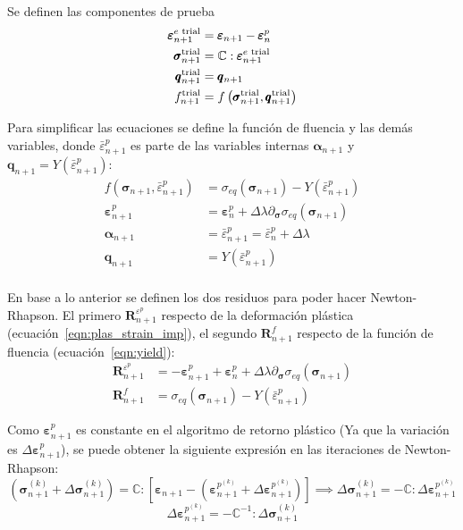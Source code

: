 \documentclass[12pt]{article}
\begin{document}
Se definen las componentes de prueba
\begin{align} 
    \pmb{\varepsilon}_{n+1}^{e\textnormal{ trial}} &= \pmb{\varepsilon}_{n+1} - \pmb{\varepsilon}_{n}^p \\
    \pmb{\sigma}_{n+1}^{\textnormal{trial}} &= \mathbb{C} : \pmb{\varepsilon}_{n+1}^{e\textnormal{ trial}} \\
    \pmb{q}_{n+1}^{\textnormal{trial}} &= \pmb{q}_{n+1} \\
    f_{n+1}^{\textnormal{trial}} &= f\left(\pmb{\sigma}_{n+1}^{\textnormal{trial}}, \pmb{q}_{n+1}^{\textnormal{trial}}\right)
\end{align}

Para simplificar las ecuaciones se define la función de fluencia y las demás variables, donde $\bar\varepsilon^p_{n+1}$ es parte de las variables internas $\pmb{\alpha}_{n+1}$ y $\pmb{q}_{n+1} = Y(\bar\varepsilon^p_{n+1})$:
\begin{align}
    f\left(\pmb{\sigma}_{n+1}, \bar\varepsilon^p_{n+1}\right) &= \sigma_{eq}\left(\pmb{\sigma}_{n+1}\right) - Y\left(\bar\varepsilon^p_{n+1}\right) \label{eqn:yield}\\
    \pmb{\varepsilon}_{n+1}^p &= \pmb{\varepsilon}^p_{n} + \Delta\lambda\partial_{\pmb{\sigma}}\sigma_{eq}\left(\pmb{\sigma}_{n+1}\right)  \label{eqn:plas_strain_imp}\\
    \pmb{\alpha}_{n+1} &= \bar\varepsilon^p_{n+1} = \bar\varepsilon^p_{n} + \Delta\lambda  \label{eqn:eff_plas_strain_imp}\\
    \pmb{q}_{n+1} &= Y(\bar\varepsilon^p_{n+1}) \\
\end{align}

En base a lo anterior se definen los dos residuos para poder hacer Newton-Rhapson. El primero $\pmb{R}_{n+1}^{\varepsilon^p}$ respecto de la deformación plástica (ecuación~\ref{eqn:plas_strain_imp}), el segundo $\pmb{R}_{n+1}^{f}$ respecto de la función de fluencia (ecuación~\ref{eqn:yield}):
\begin{align}
    \pmb{R}_{n+1}^{\varepsilon^p} &= -\pmb{\varepsilon}_{n+1}^p + \pmb{\varepsilon}_{n}^p + \Delta\lambda\partial_{\pmb{\sigma}}\sigma_{eq}\left(\pmb{\sigma}_{n+1}\right) \\
    \pmb{R}_{n+1}^{f} &= \sigma_{eq}\left(\pmb{\sigma}_{n+1}\right) - Y\left(\bar\varepsilon^p_{n+1}\right)
\end{align}

Como $\pmb{\varepsilon}^p_{n+1}$ es constante en el algoritmo de retorno plástico (Ya que la variación es $\Delta\pmb{\varepsilon}^p_{n+1}$), se puede obtener la siguiente expresión en las iteraciones de Newton-Rhapson:
\[
\left(\pmb{\sigma}_{n+1}^{(k)} + \Delta\pmb{\sigma}_{n+1}^{(k)}\right) = \mathbb{C}:\left[\pmb{\varepsilon}_{n+1} - \left(\pmb{\varepsilon}_{n+1}^{p^{(k)}} + \Delta\pmb{\varepsilon}_{n+1}^{p^{(k)}}\right)\right] \implies \Delta\pmb{\sigma}_{n+1}^{(k)} = -\mathbb{C}:\Delta\pmb{\varepsilon}_{n+1}^{p^{(k)}}
\]\[
    \Delta\pmb{\varepsilon}_{n+1}^{p^{(k)}} = -\mathbb{C}^{-1}:\Delta\pmb{\sigma}_{n+1}^{(k)}
\]
\end{document}
